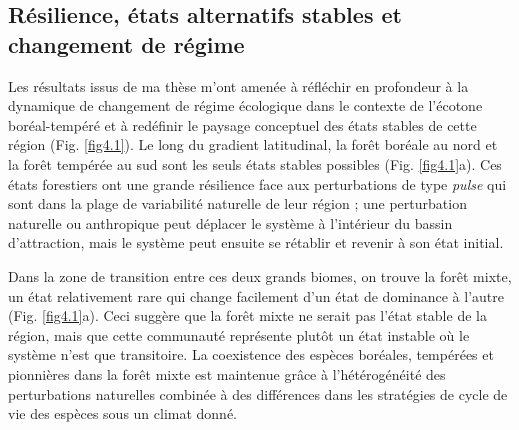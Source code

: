 \hypertarget{ruxe9silience-uxe9tats-alternatifs-stables-et-changement-de-ruxe9gime}{%
\subsection{Résilience, états alternatifs stables et changement de
régime}\label{ruxe9silience-uxe9tats-alternatifs-stables-et-changement-de-ruxe9gime}}

Les résultats issus de ma thèse m'ont amenée à réfléchir en profondeur à
la dynamique de changement de régime écologique dans le contexte de
l'écotone boréal-tempéré et à redéfinir le paysage conceptuel des états
stables de cette région (Fig. \ref{fig4.1}). Le long du gradient
latitudinal, la forêt boréale au nord et la forêt tempérée au sud sont
les seuls états stables possibles (Fig. \ref{fig4.1}a). Ces états
forestiers ont une grande résilience face aux perturbations de type
\emph{pulse} qui sont dans la plage de variabilité naturelle de leur
région \citep{grondin_have_2018}; une perturbation naturelle ou
anthropique peut déplacer le système à l'intérieur du bassin
d'attraction, mais le système peut ensuite se rétablir et revenir à son
état initial.

Dans la zone de transition entre ces deux grands biomes, on trouve la
forêt mixte, un état relativement rare qui change facilement d'un état
de dominance à l'autre (Fig. \ref{fig4.1}a). Ceci suggère que la forêt
mixte ne serait pas l'état stable de la région, mais que cette
communauté représente plutôt un état instable où le système n'est que
transitoire. La coexistence des espèces boréales, tempérées et
pionnières dans la forêt mixte est maintenue grâce à l'hétérogénéité des
perturbations naturelles combinée à des différences dans les stratégies
de cycle de vie des espèces
\citep{bouchard_tree_2006, kneeshaw_natural_2007} sous un climat donné.

